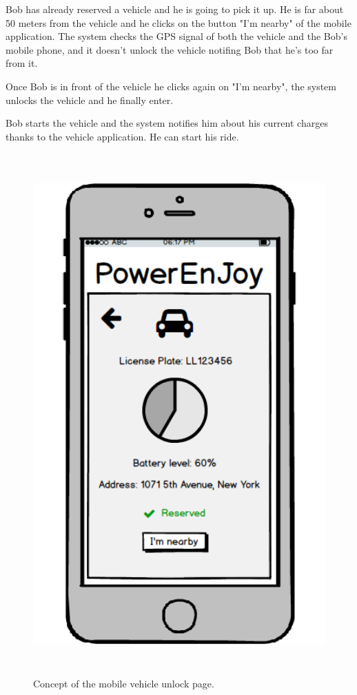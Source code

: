Bob has already reserved a vehicle and he is going to pick it up. He is far about 50 meters from the vehicle and he clicks on the button "I'm nearby" of the mobile application. The system checks the GPS signal of both the vehicle and the Bob's mobile phone, and it doesn't unlock the vehicle notifing Bob that he's too far from it.

Once Bob is in front of the vehicle he clicks again on "I'm nearby", the system unlocks the vehicle and he finally enter.

Bob starts the vehicle and the system notifies him about his current charges thanks to the vehicle application. He can start his ride.

\begin{figure}[H]
	\centering
	\includegraphics[height=20cm]{mockup/MobileUnlock.png}
	\caption{Concept of the mobile vehicle unlock page.}
\end{figure}

